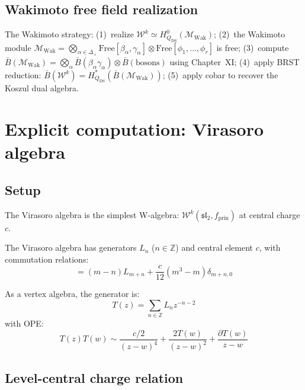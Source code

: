 \subsection{Wakimoto free field realization}

\begin{remark}
The Wakimoto strategy: (1)~realize $\mathcal{W}^k \simeq H^0_{Q_{\text{DS}}}(\mathcal{M}_{\text{Wak}})$; (2)~the Wakimoto module $\mathcal{M}_{\text{Wak}} = \bigotimes_{\alpha \in \Delta_+} \text{Free}[\beta_\alpha, \gamma_\alpha] \otimes \text{Free}[\phi_1, \ldots, \phi_r]$ is free; (3)~compute $\bar{B}(\mathcal{M}_{\text{Wak}}) = \bigotimes_\alpha \bar{B}(\beta_\alpha\gamma_\alpha) \otimes \bar{B}(\text{bosons})$ using Chapter~XI; (4)~apply BRST reduction: $\bar{B}(\mathcal{W}^k) = H^*_{Q_{\text{DS}}}(\bar{B}(\mathcal{M}_{\text{Wak}}))$; (5)~apply cobar to recover the Koszul dual algebra.
\end{remark}

\section{Explicit computation: Virasoro algebra}

\subsection{Setup}

The Virasoro algebra is the simplest W-algebra: $\mathcal{W}^k(\mathfrak{sl}_2, f_{\text{prin}})$ at central charge $c$.

\begin{definition}
The Virasoro algebra has generators $L_n$ ($n \in \mathbb{Z}$) and central element $c$, with commutation relations:
\begin{equation}
[L_m, L_n] = (m-n) L_{m+n} + \frac{c}{12}(m^3 - m)\delta_{m+n,0}
\end{equation}

As a vertex algebra, the generator is:
\begin{equation}
T(z) = \sum_{n \in \mathbb{Z}} L_n z^{-n-2}
\end{equation}
with OPE:
\begin{equation}
T(z)T(w) \sim \frac{c/2}{(z-w)^4} + \frac{2T(w)}{(z-w)^2} + \frac{\partial T(w)}{z-w}
\end{equation}
\end{definition}

\subsection{Level-central charge relation}

